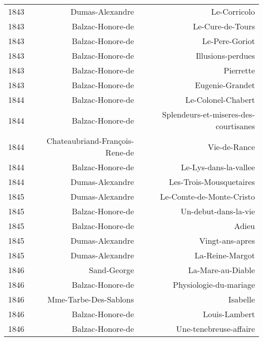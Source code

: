 \begin{xltabular}{\textwidth}{lrr}
1843 &                      Dumas-Alexandre &                          Le-Corricolo \\
1843 &                     Balzac-Honore-de &                      Le-Cure-de-Tours \\
1843 &                     Balzac-Honore-de &                        Le-Pere-Goriot \\
1843 &                     Balzac-Honore-de &                     Illusions-perdues \\
1843 &                     Balzac-Honore-de &                             Pierrette \\
1843 &                     Balzac-Honore-de &                       Eugenie-Grandet \\
1844 &                     Balzac-Honore-de &                    Le-Colonel-Chabert \\
1844 &                     Balzac-Honore-de & Splendeurs-et-miseres-des-courtisanes \\
1844 &       Chateaubriand-François-Rene-de &                          Vie-de-Rance \\
1844 &                     Balzac-Honore-de &                 Le-Lys-dans-la-vallee \\
1844 &                      Dumas-Alexandre &               Les-Trois-Mousquetaires \\
1845 &                      Dumas-Alexandre &              Le-Comte-de-Monte-Cristo \\
1845 &                     Balzac-Honore-de &                  Un-debut-dans-la-vie \\
1845 &                     Balzac-Honore-de &                                 Adieu \\
1845 &                      Dumas-Alexandre &                       Vingt-ans-apres \\
1845 &                      Dumas-Alexandre &                       La-Reine-Margot \\
1846 &                          Sand-George &                     La-Mare-au-Diable \\
1846 &                     Balzac-Honore-de &                Physiologie-du-mariage \\
1846 &                Mme-Tarbe-Des-Sablons &                              Isabelle \\
1846 &                     Balzac-Honore-de &                         Louis-Lambert \\
1846 &                     Balzac-Honore-de &                Une-tenebreuse-affaire \\

\end{xltabular}
